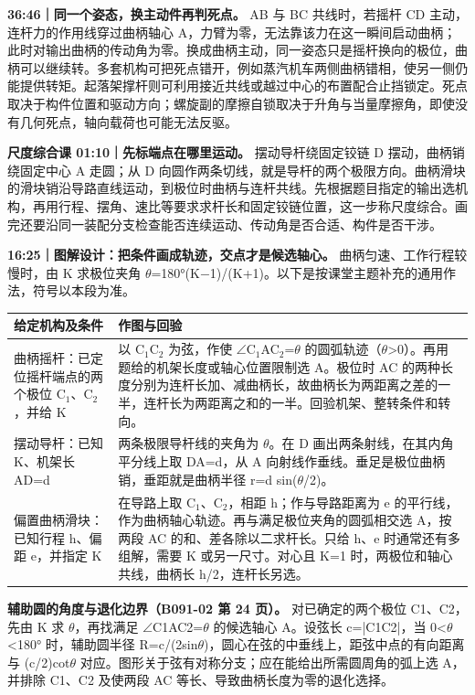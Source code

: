 \documentclass[zihao=5,a4paper,UTF8,fontset=fandol]{ctexart}
\begin{document}
\textbf{36:46｜同一个姿态，换主动件再判死点。} AB 与 BC 共线时，若摇杆 CD 主动，连杆力的作用线穿过曲柄轴心 A，力臂为零，无法靠该力在这一瞬间启动曲柄；此时对输出曲柄的传动角为零。换成曲柄主动，同一姿态只是摇杆换向的极位，曲柄可以继续转。多套机构可把死点错开，例如蒸汽机车两侧曲柄错相，使另一侧仍能提供转矩。起落架撑杆则可利用接近共线或越过中心的布置配合止挡锁定。死点取决于构件位置和驱动方向；螺旋副的摩擦自锁取决于升角与当量摩擦角，即使没有几何死点，轴向载荷也可能无法反驱。


\textbf{尺度综合课 01:10｜先标端点在哪里运动。} 摆动导杆绕固定铰链 D 摆动，曲柄销绕固定中心 A 走圆；从 D 向圆作两条切线，就是导杆的两个极限方向。曲柄滑块的滑块销沿导路直线运动，到极位时曲柄与连杆共线。先根据题目指定的输出选机构，再用行程、摆角、速比等要求求杆长和固定铰链位置，这一步称尺度综合。画完还要沿同一装配分支检查能否连续运动、传动角是否合适、构件是否干涉。


\textbf{16:25｜图解设计：把条件画成轨迹，交点才是候选轴心。} 曲柄匀速、工作行程较慢时，由 K 求极位夹角 $\theta$=180°(K$-$1)/(K+1)。以下是按课堂主题补充的通用作法，符号以本段为准。


\begin{longtable}{p{7.51cm}p{7.51cm}}
\toprule
给定机构及条件 & 作图与回验 \\

\midrule
\endhead
曲柄摇杆：已定位摇杆端点的两个极位 C$_{1}$、C$_{2}$，并给 K & 以 C$_{1}$C$_{2}$ 为弦，作使 $\angle$C$_{1}$AC$_{2}$=$\theta$ 的圆弧轨迹（$\theta$>0）。再用题给的机架长度或轴心位置限制选 A。极位时 AC 的两种长度分别为连杆长加、减曲柄长，故曲柄长为两距离之差的一半，连杆长为两距离之和的一半。回验机架、整转条件和转向。 \\
摆动导杆：已知 K、机架长 AD=d & 两条极限导杆线的夹角为 $\theta$。在 D 画出两条射线，在其内角平分线上取 DA=d，从 A 向射线作垂线。垂足是极位曲柄销，垂距就是曲柄半径 r=d sin($\theta$/2)。 \\
偏置曲柄滑块：已知行程 h、偏距 e，并指定 K & 在导路上取 C$_{1}$、C$_{2}$，相距 h；作与导路距离为 e 的平行线，作为曲柄轴心轨迹。再与满足极位夹角的圆弧相交选 A，按两段 AC 的和、差各除以二求杆长。只给 h、e 时通常还有多组解，需要 K 或另一尺寸。对心且 K=1 时，两极位和轴心共线，曲柄长 h/2，连杆长另选。 \\
\bottomrule
\end{longtable}

\textbf{辅助圆的角度与退化边界（B091-02 第 24 页）。} 对已确定的两个极位 C1、C2，先由 K 求 $\theta$，再找满足 $\angle$C1AC2=$\theta$ 的候选轴心 A。设弦长 c=|C1C2|，当 0<$\theta$<180° 时，辅助圆半径 R=c/(2sin$\theta$)，圆心在弦的中垂线上，距弦中点的有向距离与 (c/2)cot$\theta$ 对应。图形关于弦有对称分支；应在能给出所需圆周角的弧上选 A，并排除 C1、C2 及使两段 AC 等长、导致曲柄长度为零的退化选择。
\end{document}
